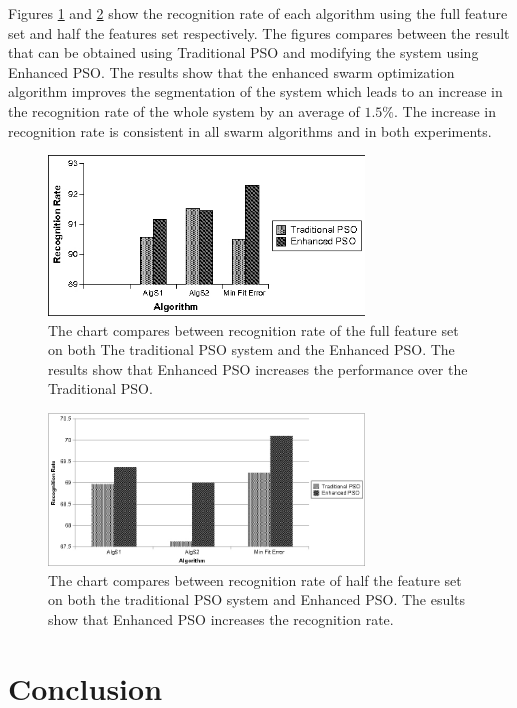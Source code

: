 \documentclass[preprint,1p,times,review]{elsarticle}
\begin{document}
Figures \ref{exp2} and \ref{exp1} show the recognition rate of each algorithm using the full feature set and half the features set respectively. The figures compares between the result that can be obtained using Traditional PSO and modifying the system using Enhanced PSO. The results show that the enhanced swarm optimization algorithm improves the segmentation of the system which leads to an increase in the recognition rate of the whole system by an average of $1.5\%$.  The increase in recognition rate is consistent in all swarm algorithms and in both experiments.
    \begin{figure}
  \centering
  \includegraphics[width=3.3in]{Experiment_92.jpg}
  \caption[Recognition accuracy]%
  {The chart compares between recognition rate of the full feature set on both
The traditional PSO system and the Enhanced PSO. The results show that Enhanced PSO increases the performance over the  Traditional PSO. }
   \label{exp2}
\end{figure}
\begin{figure}
  \centering
  \includegraphics[width=3.3in]{Experiment_68.jpg}
  \caption[Recognition accuracy]%
  {The chart compares between recognition rate of half the feature set on both
the traditional PSO system and Enhanced PSO. The esults show that Enhanced PSO increases the recognition rate. }
   \label{exp1}
\end{figure}



\section{Conclusion }
 \label{ConclusionandFutureWork}
\end{document}
